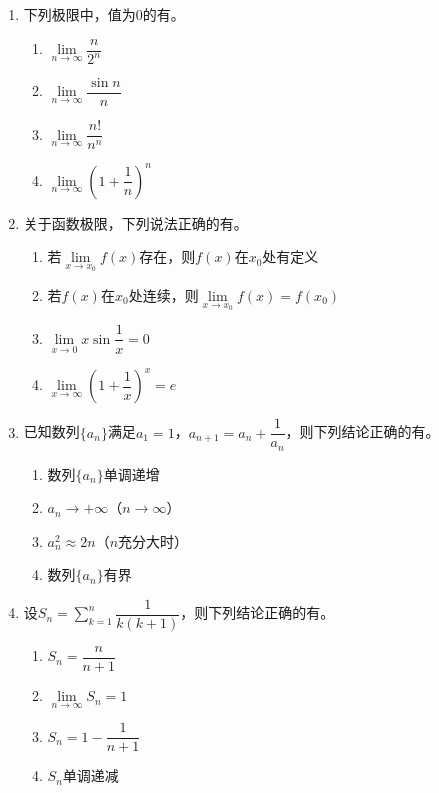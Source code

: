 \documentclass[12pt, a4paper]{ctexart}
\newcommand{\blank}[1]{\underline{\hspace{#1}}}
\begin{document}
\begin{enumerate}[start=9]
\item 下列极限中，值为$0$的有\blank{3cm}。
\begin{enumerate}[label=\Alph*.]
\item $\lim\limits_{n\to\infty}\dfrac{n}{2^n}$
\item $\lim\limits_{n\to\infty}\dfrac{\sin n}{n}$
\item $\lim\limits_{n\to\infty}\dfrac{n!}{n^n}$
\item $\lim\limits_{n\to\infty}\left(1+\dfrac{1}{n}\right)^n$
\end{enumerate}

\item 关于函数极限，下列说法正确的有\blank{3cm}。
\begin{enumerate}[label=\Alph*.]
\item 若$\lim\limits_{x\to x_0}f(x)$存在，则$f(x)$在$x_0$处有定义
\item 若$f(x)$在$x_0$处连续，则$\lim\limits_{x\to x_0}f(x)=f(x_0)$
\item $\lim\limits_{x\to 0}x\sin\dfrac{1}{x}=0$
\item $\lim\limits_{x\to\infty}\left(1+\dfrac{1}{x}\right)^x=e$
\end{enumerate}

\item 已知数列$\{a_n\}$满足$a_1=1$，$a_{n+1}=a_n+\dfrac{1}{a_n}$，则下列结论正确的有\blank{3cm}。
\begin{enumerate}[label=\Alph*.]
\item 数列$\{a_n\}$单调递增
\item $a_n \to +\infty$（$n\to\infty$）
\item $a_n^2 \approx 2n$（$n$充分大时）
\item 数列$\{a_n\}$有界
\end{enumerate}

\item 设$S_n=\sum\limits_{k=1}^{n}\dfrac{1}{k(k+1)}$，则下列结论正确的有\blank{3cm}。
\begin{enumerate}[label=\Alph*.]
\item $S_n=\dfrac{n}{n+1}$
\item $\lim\limits_{n\to\infty}S_n=1$
\item $S_n=1-\dfrac{1}{n+1}$
\item $S_n$单调递减
\end{enumerate}
\end{enumerate}

\vspace{1em}
\end{document}

